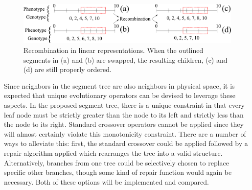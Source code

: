 \documentclass{article}
\begin{document}
\begin{figure}
    \centering
    \includegraphics[width=\textwidth]{linearxover}
    \caption{Recombination in linear representations. When the outlined segments in (a) and (b) are swapped, the resulting children, (c) and (d) are still properly ordered.}
    \label{fig:linearxover}
\end{figure}






Since neighbors in the segment tree are also neighbors in physical space, it is expected that unique evolutionary operators can be devised to leverage these aspects. In the proposed segment tree, there is a unique constraint in that every leaf node must be strictly greater than the node to its left and strictly less than the node to its right. Standard crossover operators cannot be applied since they will almost certainly violate this monotonicity constraint. There are a number of ways to alleviate this: first, the standard crossover could be applied followed by a repair algorithm applied which rearranges the tree into a valid structure. Alternatively, branches from one tree could be selectively chosen to replace specific other branches, though some kind of repair function would again be necessary. Both of these options will be implemented and compared.
\end{document}
